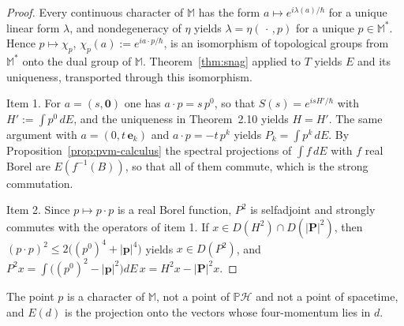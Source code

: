 \begin{proof}
	Every continuous character of $\mathbb{M}$ has the form $a\mapsto e^{i\lambda(a)/\hbar}$ for a unique linear form $\lambda$, and nondegeneracy of $\eta$ yields $\lambda=\eta(\,\cdot\,,p)$ for a unique $p\in\mathbb{M}^*$. Hence $p\mapsto\chi_p$, $\chi_p(a):=e^{ia\cdot p/\hbar}$, is an isomorphism of topological groups from $\mathbb{M}^*$ onto the dual group of $\mathbb{M}$. Theorem~\ref{thm:snag} applied to $T$ yields $E$ and its uniqueness, transported through this isomorphism.
	
	Item 1. For $a=(s,\mathbf{0})$ one has $a\cdot p=s\,p^0$, so that $S(s)=e^{isH'/\hbar}$ with $H':=\int p^0\,dE$, and the uniqueness in Theorem~2.10 yields $H=H'$. The same argument with $a=(0,t\,\mathbf{e}_k)$ and $a\cdot p=-t\,p^k$ yields $P_k=\int p^k\,dE$. By Proposition~\ref{prop:pvm-calculus} the spectral projections of $\int f\,dE$ with $f$ real Borel are $E(f^{-1}(B))$, so that all of them commute, which is the strong commutation.
	
	Item 2. Since $p\mapsto p\cdot p$ is a real Borel function, $P^2$ is selfadjoint and strongly commutes with the operators of item 1. If $x\in D(H^2)\cap D(|\mathbf{P}|^2)$, then $(p\cdot p)^2\leq2\big((p^0)^4+|\mathbf{p}|^4\big)$ yields $x\in D(P^2)$, and $P^2x=\int\big((p^0)^2-|\mathbf{p}|^2\big)dE\,x=H^2x-|\mathbf{P}|^2x$.
\end{proof}

\noindent The point $p$ is a character of $\mathbb{M}$, not a point of $\mathbb{P}\mathcal{H}$ and not a point of spacetime, and $E(d)$ is the projection onto the vectors whose four-momentum lies in $d$.


